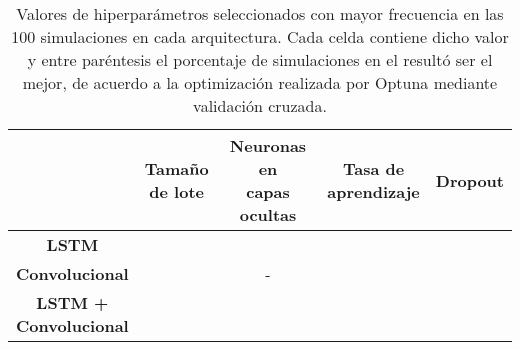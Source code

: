 \begin{table}[H]
    \centering
    \renewcommand{\arraystretch}{1.2}
    \begin{tabular}{|c|c|c|c|c|}
        \hline
            & \makecell{\textbf{Tamaño}\\\textbf{de lote}}
            & \makecell{\textbf{Neuronas en}\\\textbf{capas ocultas}}
            & \makecell{\textbf{Tasa de}\\\textbf{aprendizaje}}
            & \textbf{Dropout} \\ \hline\hline
        \textbf{LSTM}
            &  &  &  &  \\ \hline
        \textbf{Convolucional}
            &   & -          &  &  \\ \hline
        \makecell{\textbf{LSTM +}\\\textbf{Convolucional}}
            &   &  &  &  \\
        \hline
    \end{tabular}
    \caption{Valores de hiperparámetros seleccionados con mayor frecuencia en las 100
    simulaciones en cada arquitectura. Cada celda contiene dicho valor y entre paréntesis
    el porcentaje de simulaciones en el resultó ser el mejor, de acuerdo a la optimización
    realizada por Optuna mediante validación cruzada.}
    \label{tab:hyperparams_exp1}
\end{table}